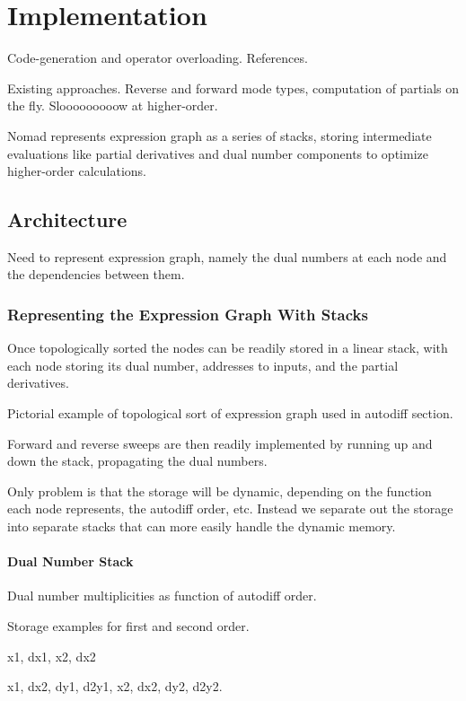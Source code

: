 \chapter{Implementation}

Code-generation and operator overloading.  References.

Existing approaches.  Reverse and forward mode types,
computation of partials on the fly.  Slooooooooow at higher-order.  

Nomad represents expression graph as a series of stacks,
storing intermediate evaluations like partial derivatives and
dual number components to optimize higher-order calculations.

\section{Architecture}

Need to represent expression graph, namely the dual numbers
at each node and the dependencies between them.

\subsection{Representing the Expression Graph With Stacks}

Once topologically sorted the nodes can be readily stored in
a linear stack, with each node storing its dual number, addresses
to inputs, and the partial derivatives.

Pictorial example of topological sort of expression graph used
in autodiff section.

Forward and reverse sweeps are then readily implemented by
running up and down the stack, propagating the dual numbers.

Only problem is that the storage will be dynamic, depending on the
function each node represents, the autodiff order, etc.  Instead
we separate out the storage into separate stacks that can more
easily handle the dynamic memory.

\subsubsection{Dual Number Stack}

Dual number multiplicities as function of autodiff order.

Storage examples for first and second order.

x1, dx1, x2, dx2

x1, dx2, dy1, d2y1, x2, dx2, dy2, d2y2.

